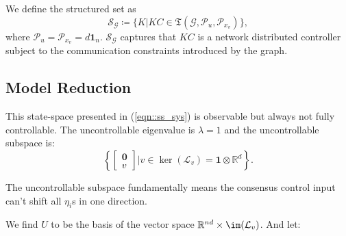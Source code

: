 We define the structured set as
\[
\mathcal{S}_\mathcal{G}\coloneqq \{K\vert KC \in \mathfrak{T}(\mathcal{G},\mathcal{P}_u,\mathcal{P}_{x_v})\},
\]
where \(\mathcal{P}_u = \mathcal{P}_{x_v} = d\mathbf{1}_n\). \(\mathcal{S}_\mathcal{G}\) captures that \(KC\) is a network distributed controller subject to the communication constraints introduced by the graph. 


\subsection{Model Reduction}
This state-space presented in (\ref{eqn::ss_sys}) is observable but always not fully controllable. The uncontrollable eigenvalue is \(\lambda = 1\) and the uncontrollable subspace is:
\[
\left\{
\begin{bmatrix}
    \mathbf{0}\\ v
\end{bmatrix}\vert 
v \in \ker(\mathcal{L}_v) = \mathbf{1}\otimes \mathbb{R}^d\right\} .
\]
\begin{rem}
The uncontrollable subspace fundamentally means the consensus control input can't shift all \(\eta_i\)s in one direction.    
\end{rem}
We find \(U\) to be the basis of the vector space \(\mathbb{R}^{nd} \times \im(\mathcal{L}_v)\). And let:

